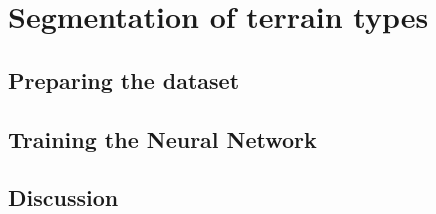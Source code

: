 \section{Segmentation of terrain types}

\subsection{Preparing the dataset}

\subsection{Training the Neural Network}

\subsection{Discussion}

\newpage
